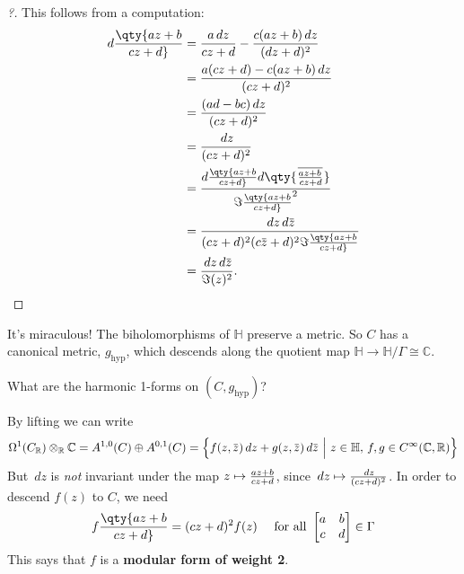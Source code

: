 \begin{proof}[?]

This follows from a computation:
\begin{align*}
d\qty{ az + b \over cz + d} 
&= {a\,dz\over cz + d} - {c (az+b)\,dz\over (dz+d)^2 } \\
&= {a (cz+d) - c(az+b) \,dz\over (cz+d)^2} \\
&= { (ad-bc)\,dz\over  (cz + d)^2 } \\
&= {\,dz\over  (cz + d)^2 } \\
&= { d\qty{ az+b \over cz+d} d \qty{\mkern 1.5mu\overline{\mkern-1.5mu az + b \over cz + d\mkern-1.5mu}\mkern 1.5mu} \over \Im\qty{az+b \over cz+d}^2 } \\
&= { \,dz\,d\mkern 1.5mu\overline{\mkern-1.5muz\mkern-1.5mu}\mkern 1.5mu \over (cz+d)^2(c \mkern 1.5mu\overline{\mkern-1.5muz\mkern-1.5mu}\mkern 1.5mu + d)^2 \Im\qty{az+b \over cz+d} } \\
&= { \,dz\,d\mkern 1.5mu\overline{\mkern-1.5muz\mkern-1.5mu}\mkern 1.5mu \over \Im(z)^2 } 
.\end{align*}

\end{proof}

\begin{remark}

It's miraculous! The biholomorphisms of \({\mathbb{H}}\) preserve a
metric. So \(C\) has a canonical metric, \(g_\text{hyp}\), which
descends along the quotient map
\({\mathbb{H}}\to {\mathbb{H}}/\Gamma \cong {\mathbb{C}}\).

\end{remark}

\begin{question}

What are the harmonic 1-forms on \((C, g_\text{hyp})\)?

\end{question}

\begin{remark}

By lifting we can write
\begin{align*} 
\Omega^1(C_{\mathbb{R}}) \otimes_{\mathbb{R}}{\mathbb{C}}= A^{1, 0}(C) \oplus A^{0, 1}(C) 
= 
\left\{{ f(z, \mkern 1.5mu\overline{\mkern-1.5muz\mkern-1.5mu}\mkern 1.5mu)\,dz+ g(z, \mkern 1.5mu\overline{\mkern-1.5muz\mkern-1.5mu}\mkern 1.5mu) \,d\mkern 1.5mu\overline{\mkern-1.5muz\mkern-1.5mu}\mkern 1.5mu {~\mathrel{\Big|}~}z\in {\mathbb{H}}, \, f,g\in C^{\infty }({\mathbb{C}}, {\mathbb{R}}) }\right\}  
\end{align*}
But \(\,dz\) is \emph{not} invariant under the map
\(z\mapsto {az+b \over cz+d}\), since
\(\,dz\mapsto {\,dz\over (cz+d)^2 }\). In order to descend \(f(z)\) to
\(C\), we need
\begin{align*}
f\qty{az +b \over cz + d} = (cz+d)^2 f(z)
&&
\text{ for all } 
\begin{bmatrix}
a & b 
\\
c & d
\end{bmatrix}
\in \Gamma
\end{align*}
This says that \(f\) is a \textbf{modular form of weight 2}.

\end{remark}

